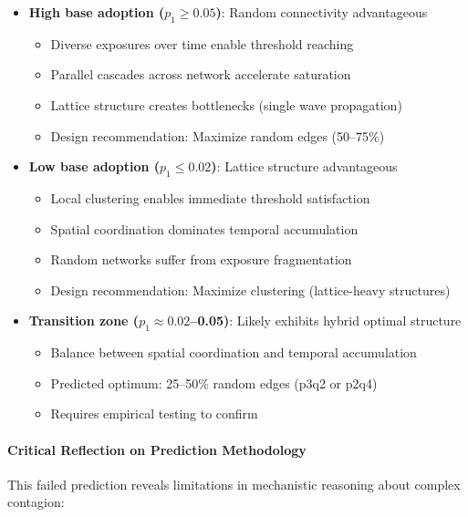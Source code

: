 \documentclass[12pt,a4paper]{article}
\begin{document}
\begin{itemize}
    \item \textbf{High base adoption ($p_1 \geq 0.05$)}: Random connectivity advantageous
    \begin{itemize}
        \item Diverse exposures over time enable threshold reaching
        \item Parallel cascades across network accelerate saturation
        \item Lattice structure creates bottlenecks (single wave propagation)
        \item Design recommendation: Maximize random edges (50--75\%)
    \end{itemize}

    \item \textbf{Low base adoption ($p_1 \leq 0.02$)}: Lattice structure advantageous
    \begin{itemize}
        \item Local clustering enables immediate threshold satisfaction
        \item Spatial coordination dominates temporal accumulation
        \item Random networks suffer from exposure fragmentation
        \item Design recommendation: Maximize clustering (lattice-heavy structures)
    \end{itemize}

    \item \textbf{Transition zone ($p_1 \approx 0.02$--0.05)}: Likely exhibits hybrid optimal structure
    \begin{itemize}
        \item Balance between spatial coordination and temporal accumulation
        \item Predicted optimum: 25--50\% random edges (p3q2 or p2q4)
        \item Requires empirical testing to confirm
    \end{itemize}
\end{itemize}

\paragraph{Critical Reflection on Prediction Methodology}

This failed prediction reveals limitations in mechanistic reasoning about complex contagion:
\end{document}
